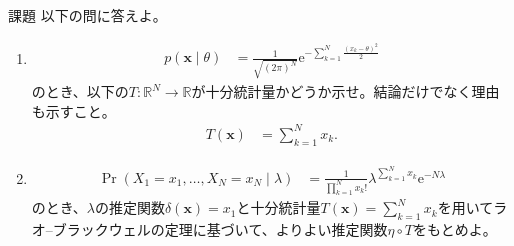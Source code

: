 \documentclass[lualatex,handout]{beamer}
\theoremstyle{definition}
\begin{document}
\begin{frame}{課題}
\small
以下の問に答えよ。
\begin{enumerate}
\setlength{\itemsep}{1em}
\item 
\begin{align*}
p(\symbf{x}\mid\theta)&= \frac1{\sqrt{(2\pi)^N}}\mathrm{e}^{-\sum_{k=1}^N\frac{(x_k-\theta)^2}2}
\end{align*}
のとき、以下の$T\colon\mathbb{R}^N\to\mathbb{R}$が十分統計量かどうか示せ。結論だけでなく理由も示すこと。
\begin{align*}
T(\symbf{x})&= \sum_{k=1}^N x_k.
\end{align*}
\item
\begin{align*}
\Pr(X_1=x_1,\dotsc,X_N=x_N\mid\lambda)&= \frac1{\prod_{k=1}^N x_k!}\lambda^{\sum_{k=1}^N x_k} \mathrm{e}^{-N\lambda}
\end{align*}
のとき、$\lambda$の推定関数$\delta(\symbf{x})=x_1$と十分統計量$T(\symbf{x})=\sum_{k=1}^Nx_k$を用いてラオ--ブラックウェルの定理に基づいて、よりよい推定関数$\eta\circ T$をもとめよ。
\end{enumerate}
\end{frame}
\end{document}
